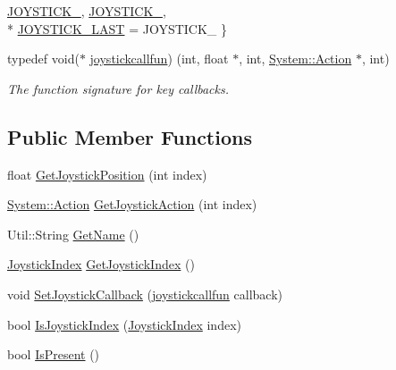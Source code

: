\begin{DoxyCompactItemize}
\hyperlink{class_tri_1_1_input_1_1_joystick_ae053177eed8f746c683d7bb9afc8dbb3a117825d42fa2d66416bd43ccb322397b}{J\+O\+Y\+S\+T\+I\+C\+K\+\_}, 
\hyperlink{class_tri_1_1_input_1_1_joystick_ae053177eed8f746c683d7bb9afc8dbb3af9758a824d5c015e75da0a5fee0b1ef2}{J\+O\+Y\+S\+T\+I\+C\+K\+\_}, 
\\*
\hyperlink{class_tri_1_1_input_1_1_joystick_ae053177eed8f746c683d7bb9afc8dbb3aa6ae366304a575777d1af63334af61fb}{J\+O\+Y\+S\+T\+I\+C\+K\+\_\+\+L\+A\+S\+T} = J\+O\+Y\+S\+T\+I\+C\+K\+\_
 \}
\item 
typedef void($\ast$ \hyperlink{class_tri_1_1_input_1_1_joystick_adb19d991b2b53faf342e4497758d3764}{joystickcallfun}) (int, float $\ast$, int, \hyperlink{namespace_tri_1_1_input_1_1_system_a79600e9f4ed835251eed1706ce96bed0}{System\+::\+Action} $\ast$, int)
\begin{DoxyCompactList}\small\item\em The function signature for key callbacks. \end{DoxyCompactList}\end{DoxyCompactItemize}
\subsection*{Public Member Functions}
\begin{DoxyCompactItemize}
\item 
float \hyperlink{class_tri_1_1_input_1_1_joystick_a39d0488c1b8890593fe05aca340f55f5}{Get\+Joystick\+Position} (int index)
\item 
\hyperlink{namespace_tri_1_1_input_1_1_system_a79600e9f4ed835251eed1706ce96bed0}{System\+::\+Action} \hyperlink{class_tri_1_1_input_1_1_joystick_a0798e6984417aa7e4b87ffa20aa313f9}{Get\+Joystick\+Action} (int index)
\item 
Util\+::\+String \hyperlink{class_tri_1_1_input_1_1_joystick_aa5071d1361829912b7a70ad62fdc5f7b}{Get\+Name} ()
\item 
\hyperlink{class_tri_1_1_input_1_1_joystick_ae053177eed8f746c683d7bb9afc8dbb3}{Joystick\+Index} \hyperlink{class_tri_1_1_input_1_1_joystick_afec0add8c3e520e089cf18a52d131164}{Get\+Joystick\+Index} ()
\item 
void \hyperlink{class_tri_1_1_input_1_1_joystick_a3aec815dc3ccb5a5b91da00be6e91a16}{Set\+Joystick\+Callback} (\hyperlink{class_tri_1_1_input_1_1_joystick_adb19d991b2b53faf342e4497758d3764}{joystickcallfun} callback)
\item 
bool \hyperlink{class_tri_1_1_input_1_1_joystick_a5434131b363bf9af7d3e6f043eeda15a}{Is\+Joystick\+Index} (\hyperlink{class_tri_1_1_input_1_1_joystick_ae053177eed8f746c683d7bb9afc8dbb3}{Joystick\+Index} index)
\item 
bool \hyperlink{class_tri_1_1_input_1_1_joystick_a6ca63fab5af16061786d2752defee239}{Is\+Present} ()
\end{DoxyCompactItemize}
